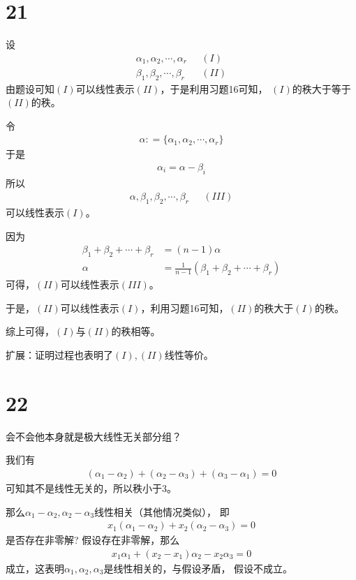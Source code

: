 \documentclass{article}
\begin{document}
\section*{21}

设
\begin{align*}
  \alpha_1, \alpha_2, \cdots, \alpha_r \ \ \  & (I)  \\
  \beta_1, \beta_2, \cdots, \beta_r \ \ \     & (II)
\end{align*}
由题设可知$(I)$可以线性表示$(II)$，于是利用习题16可知，
$(I)$的秩大于等于$(II)$的秩。

令
\begin{align*}
  \alpha : = \{ \alpha_1, \alpha_2, \cdots, \alpha_r\}
\end{align*}
于是
\begin{align*}
  \alpha_i = \alpha - \beta_i
\end{align*}
所以
\begin{align*}
  \alpha, \beta_1, \beta_2, \cdots, \beta_r \ \ \  & (III)
\end{align*}
可以线性表示$(I)$。

因为
\begin{align*}
  \beta_1 + \beta_2 + \cdots + \beta_r & = (n - 1) \alpha                                        \\
  \alpha                               & = \frac{1}{n - 1}(\beta_1 + \beta_2 + \cdots + \beta_r)
\end{align*}
可得，$(II)$可以线性表示$(III)$。

于是，$(II)$可以线性表示$(I)$，利用习题16可知，$(II)$的秩大于$(I)$的秩。

综上可得，$(I)$与$(II)$的秩相等。

扩展：证明过程也表明了$(I), (II)$线性等价。

\section*{22}

会不会他本身就是极大线性无关部分组？

我们有
\begin{align*}
  (\alpha_1 - \alpha_2) + (\alpha_2 - \alpha_3) + (\alpha_3 - \alpha_1) = 0
\end{align*}
可知其不是线性无关的，所以秩小于$3$。

那么$\alpha_1 - \alpha_2, \alpha_2 - \alpha_3$线性相关（其他情况类似），
即
\begin{align*}
  x_1(\alpha_1 - \alpha_2) + x_2(\alpha_2 - \alpha_3) = 0
\end{align*}
是否存在非零解? 假设存在非零解，那么
\begin{align*}
  x_1 \alpha_1 + (x_2 - x_1) \alpha_2 - x_2 \alpha_3 = 0
\end{align*}
成立，这表明$\alpha_1, \alpha_2, \alpha_3$是线性相关的，与假设矛盾，
假设不成立。
\end{document}
